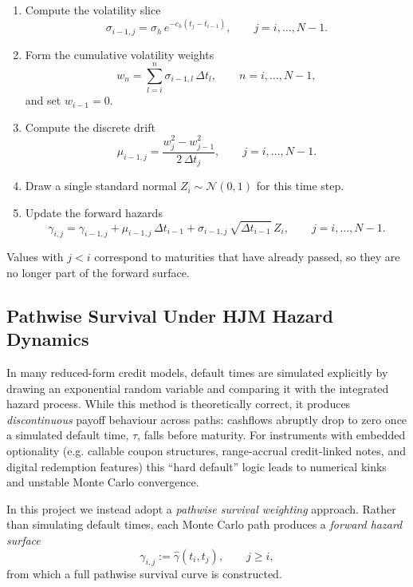 \begin{enumerate}
    \item Compute the volatility slice
          \[
          \sigma_{i-1,j} = \sigma_h\, e^{-c_h(t_j - t_{i-1})},
          \qquad j = i,\dots,N-1.
          \]
    \item Form the cumulative volatility weights
          \[
          w_n
            = \sum_{l=i}^n \sigma_{i-1,l}\,\Delta t_l,
            \qquad n = i,\dots,N-1,
          \]
          and set $w_{i-1} = 0$.
    \item Compute the discrete drift
          \[
          \mu_{i-1,j}
            = \frac{w_j^2 - w_{j-1}^2}{2\,\Delta t_j},
            \qquad j = i,\dots,N-1.
          \]
    \item Draw a single standard normal $Z_i \sim \mathcal{N}(0,1)$ for this
          time step.
    \item Update the forward hazards
          \[
          \gamma_{i,j}
            = \gamma_{i-1,j}
              + \mu_{i-1,j}\,\Delta t_{i-1}
              + \sigma_{i-1,j}\,\sqrt{\Delta t_{i-1}}\,Z_i,
            \qquad j = i,\dots,N-1.
          \]
\end{enumerate}

Values with $j < i$ correspond to maturities that have already passed, so they
are no longer part of the forward surface.


\subsection{Pathwise Survival Under HJM Hazard Dynamics}

In many reduced-form credit models, default times are simulated explicitly by
drawing an exponential random variable and comparing it with the integrated
hazard process. While this method is theoretically correct, it produces
\emph{discontinuous} payoff behaviour across paths: cashflows abruptly drop to
zero once a simulated default time, $\tau$, falls before maturity. For instruments
with embedded optionality (e.g.  callable coupon structures, range-accrual
credit-linked notes, and digital redemption features) this “hard default” logic
leads to numerical kinks and unstable Monte Carlo convergence.

In this project we instead adopt a \emph{pathwise survival weighting} approach.
Rather than simulating default times, each Monte Carlo path produces a
\emph{forward hazard surface}
\[
\gamma_{i,j} := \widehat{\gamma}(t_i, t_j),
\qquad j \ge i,
\]
from which a full pathwise survival curve is constructed.

